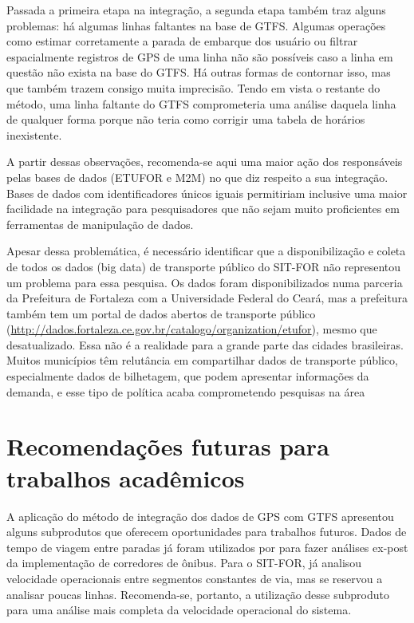 \documentclass[        
    a4paper,          %
    12pt,             %
    chapter=TITLE,    %
    section=Title,    %
    subsection=Title, %
    oneside,          %
    english,          %
    spanish,          %
    brazil,           %
    fleqn             %
]{abntex2}
\begin{document}
  Passada a primeira etapa na integração, a segunda etapa também traz alguns problemas: há algumas linhas faltantes na base de GTFS. Algumas operações como estimar corretamente a parada de embarque dos usuário ou filtrar espacialmente registros de GPS de uma linha não são possíveis caso a linha em questão não exista na base do GTFS. Há outras formas de contornar isso, mas que também trazem consigo muita imprecisão. Tendo em vista o restante do método, uma linha faltante do GTFS comprometeria uma análise daquela linha de qualquer forma porque não teria como corrigir uma tabela de horários inexistente.
  
  A partir dessas observações, recomenda-se aqui uma maior ação dos responsáveis pelas bases de dados (ETUFOR e M2M) no que diz respeito a sua integração. Bases de dados com identificadores únicos iguais permitiriam inclusive uma maior facilidade na integração para pesquisadores que não sejam muito proficientes em ferramentas de manipulação de dados.
  
  Apesar dessa problemática, é necessário identificar que a disponibilização e coleta de todos os dados (big data) de transporte público do SIT-FOR não representou um problema para essa pesquisa. Os dados foram disponibilizados numa parceria da Prefeitura de Fortaleza com a Universidade Federal do Ceará, mas a prefeitura também tem um portal de dados abertos de transporte público (\url{http://dados.fortaleza.ce.gov.br/catalogo/organization/etufor}), mesmo que desatualizado. Essa não é a realidade para a grande parte das cidades brasileiras. Muitos municípios têm relutância em compartilhar dados de transporte público, especialmente dados de bilhetagem, que podem apresentar informações da demanda, e esse tipo de política acaba comprometendo pesquisas na área
  
  \hypertarget{recomendacoes-futuras-para-trabalhos-academicos}{%
  \section{Recomendações futuras para trabalhos acadêmicos}\label{recomendacoes-futuras-para-trabalhos-academicos}}
  
  A aplicação do método de integração dos dados de GPS com GTFS apresentou alguns subprodutos que oferecem oportunidades para trabalhos futuros. Dados de tempo de viagem entre paradas já foram utilizados por \citet{Arbex2016} para fazer análises ex-post da implementação de corredores de ônibus. Para o SIT-FOR, \citet{Rabay2017} já analisou velocidade operacionais entre segmentos constantes de via, mas se reservou a analisar poucas linhas. Recomenda-se, portanto, a utilização desse subproduto para uma análise mais completa da velocidade operacional do sistema.
  
\end{document}
